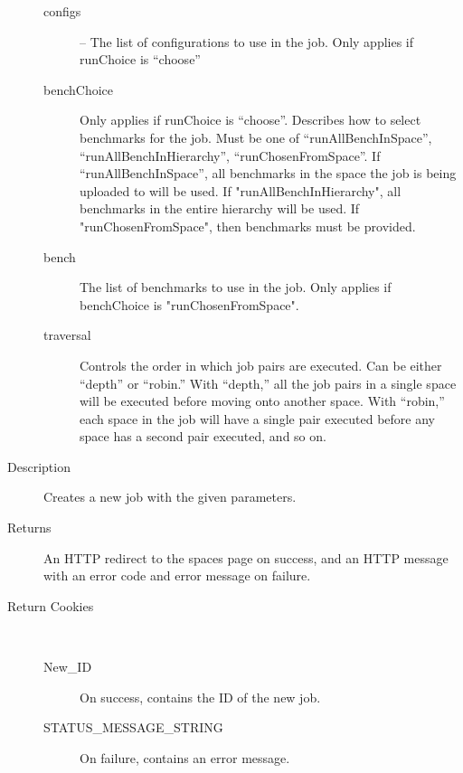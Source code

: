 \begin{description}
\begin{description}
	\item [configs]  – The list of configurations to use in the job. Only applies if runChoice is “choose”
	\item [benchChoice]  Only applies if runChoice is “choose”. Describes how to select benchmarks for the job. Must be one of “runAllBenchInSpace”, “runAllBenchInHierarchy”, “runChosenFromSpace”. If “runAllBenchInSpace”, all benchmarks in the space the job is being uploaded to will be used. If "runAllBenchInHierarchy", all benchmarks in the entire hierarchy will be used. If "runChosenFromSpace", then benchmarks must be provided.
	\item [bench]  The list of benchmarks to use in the job. Only applies if benchChoice is "runChosenFromSpace".
	\item [traversal]  Controls the order in which job pairs are executed. Can be either “depth” or “robin.” With “depth,” all the job pairs in a single space will be executed before moving onto another space. With “robin,” each space in the job will have a single pair executed before any space has a second pair executed, and so on.
	\end{description}
\item [Description] Creates a new job with the given parameters.
\item [Returns] An HTTP redirect to the spaces page on success, and an HTTP message with an error code and error message on failure.
\item [Return Cookies] \
	\begin{description}
	\item [New\_ID]  On success, contains the ID of the new job.
	\item [STATUS\_MESSAGE\_STRING] \type{String} On failure, contains an error message.
	\end{description}
\end{description}


